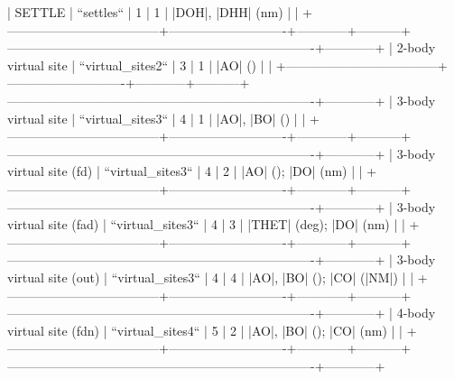             | SETTLE                             | ``settles``                | 1          | 1         | |DOH|, |DHH| (nm)                                                       |            | 
            +------------------------------------+----------------------------+------------+-----------+-------------------------------------------------------------------------+------------+
            | 2-body virtual site                | ``virtual_sites2``         | 3          | 1         | |AO| ()                                                                 |            | 
            +------------------------------------+----------------------------+------------+-----------+-------------------------------------------------------------------------+------------+
            | 3-body virtual site                | ``virtual_sites3``         | 4          | 1         | |AO|, |BO| ()                                                           |            | 
            +------------------------------------+----------------------------+------------+-----------+-------------------------------------------------------------------------+------------+
            | 3-body virtual site (fd)           | ``virtual_sites3``         | 4          | 2         | |AO| (); |DO| (nm)                                                      |            | 
            +------------------------------------+----------------------------+------------+-----------+-------------------------------------------------------------------------+------------+
            | 3-body virtual site (fad)          | ``virtual_sites3``         | 4          | 3         | |THET| (deg); |DO| (nm)                                                 |            | 
            +------------------------------------+----------------------------+------------+-----------+-------------------------------------------------------------------------+------------+
            | 3-body virtual site (out)          | ``virtual_sites3``         | 4          | 4         | |AO|, |BO| (); |CO| (|NM|)                                              |            | 
            +------------------------------------+----------------------------+------------+-----------+-------------------------------------------------------------------------+------------+
            | 4-body virtual site (fdn)          | ``virtual_sites4``         | 5          | 2         | |AO|, |BO| (); |CO| (nm)                                                |            | 
            +------------------------------------+----------------------------+------------+-----------+-------------------------------------------------------------------------+------------+
